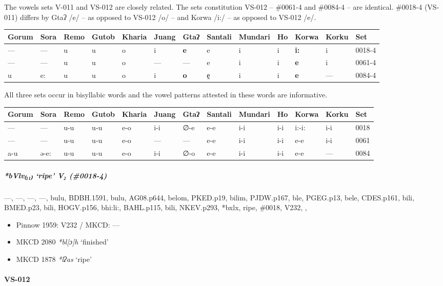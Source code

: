 \documentclass[a4paper,]{article}
\let\oldparagraph\paragraph
\renewcommand{\paragraph}[1]{\oldparagraph{#1}\mbox{}}
\let\oldsubparagraph\subparagraph
\renewcommand{\subparagraph}[1]{\oldsubparagraph{#1}\mbox{}}
\begin{document}
The vowels sets V-011 and VS-012 are closely related. The sets
constitution VS-012 -- \#0061-4 and \#0084-4 -- are identical. \#0018-4
(VS-011) differs by Gtaʔ /e/ -- as opposed to VS-012 /o/ -- and Korwa
/i:/ -- as opposed to VS-012 /e/.

\begin{longtable}[]{@{}lllllllllllll@{}}
\toprule
Gorum & Sora & Remo & Gutob & Kharia & Juang & Gtaʔ & Santali & Mundari
& Ho & Korwa & Korku & Set\tabularnewline
\midrule
\endhead
--- & --- & u & u & o & i & \textbf{e} & e & i & i & \textbf{i:} & i &
0018-4\tabularnewline
--- & --- & u & u & o & --- & --- & e & i & i & \textbf{e} & i &
0061-4\tabularnewline
u & e: & u & u & o & i & \textbf{o} & e̠ & i & i & \textbf{e} & --- &
0084-4\tabularnewline
\bottomrule
\end{longtable}

All three sets occur in bisyllabic words and the vowel patterns attested
in these words are informative.

\begin{longtable}[]{@{}lllllllllllll@{}}
\toprule
Gorum & Sora & Remo & Gutob & Kharia & Juang & Gtaʔ & Santali & Mundari
& Ho & Korwa & Korku & Set\tabularnewline
\midrule
\endhead
--- & --- & u-u & u-u & e-o & i-i & ∅-e & e-e & i-i & i-i & i:-i: & i-i
& 0018\tabularnewline
--- & --- & u-u & u-u & e-o & --- & --- & e-e & i-i & i-i & e-e & i-i &
0061\tabularnewline
a-u & ə-e: & u-u & u-u & e-o & i-i & ∅-o & e-e & i-i & i-i & e-e & --- &
0084\tabularnewline
\bottomrule
\end{longtable}

\subparagraph{\texorpdfstring{\emph{*bVlv₍₁₁₎} `ripe' V₂
(\#0018-4)}{*bVlv₍₁₁₎ ripe V₂ (\#0018-4)}}\label{bvlv-ripe-v-0018-4}

---, ---, ---, ---, bulu, BDBH.1591, bulu, AG08.p644, belom, PKED.p19,
bilim, PJDW.p167, ble, PGEG.p13, bele, CDES.p161, bili, BMED.p23, bili,
HOGV.p156, bhi:li:, BAHL.p115, bili, NKEV.p293, *bxlx, ripe, \#0018,
V232, ,

\begin{itemize}
\item
  Pinnow 1959: V232 / MKCD: ---
\item
  MKCD 2080 \emph{*bl{[}ɔ{]}h} `finished'
\item
  MKCD 1878 \emph{*lʔas} `ripe'
\end{itemize}

\paragraph{VS-012}\label{vs-012}
\end{document}

